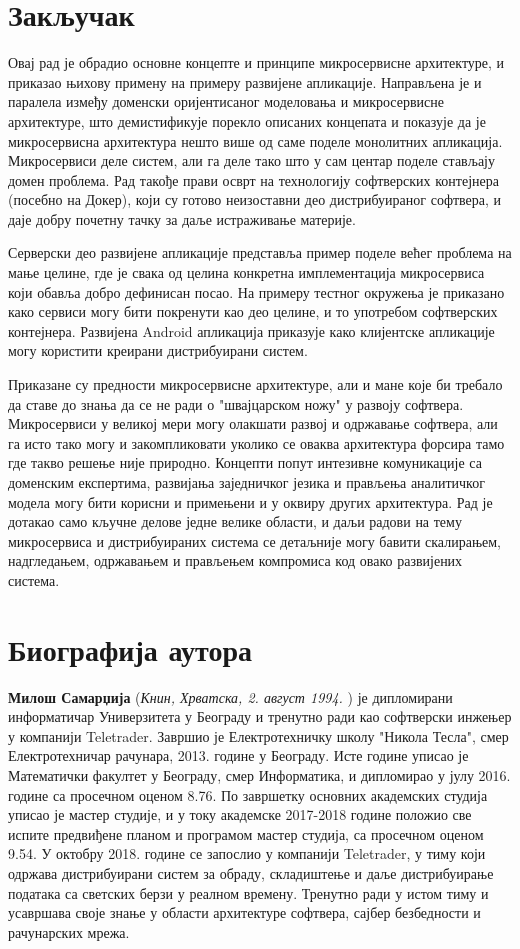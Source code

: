 \documentclass[12pt,oneside]{memoir}
\begin{document}
\chapter{Закључак}
Овај рад је обрадио основне концепте и принципе микросервисне архитектуре, и приказао њихову примену на примеру развијене апликације. Направљена је и паралела између доменски оријентисаног моделовања и микросервисне архитектуре, што демистификује порекло описаних концепата и показује да је микросервисна архитектура нешто више од саме поделе монолитних апликација. Микросервиси деле систем, али га деле тако што у сам центар поделе стављају домен проблема. Рад такође прави осврт на технологију софтверских контејнера (посебно на Докер), који су готово неизоставни део дистрибуираног софтвера, и даје добру почетну тачку за даље истраживање материје.

Серверски део развијене апликације представља пример поделе већег проблема на мање целине, где је свака од целина конкретна имплементација микросервиса који обавља добро дефинисан посао. На примеру тестног окружења је приказано како сервиси могу бити покренути као део целине, и то употребом софтверских контејнера. Развијена Android апликација приказује како клијентске апликације могу користити креирани дистрибуирани систем.

Приказане су предности микросервисне архитектуре, али и мане које би требало да ставе до знања да се не ради о "швајцарском ножу" у развоју софтвера. Микросервиси у великој мери могу олакшати развој и одржавање софтвера, али га исто тако могу и закомпликовати уколико се оваква архитектура форсира тамо где такво решење није природно. Концепти попут интезивне комуникације са доменским експертима, развијања заједничког језика и прављења аналитичког модела могу бити корисни и примењени и у оквиру других архитектура. Рад је дотакао само кључне делове једне велике области, и даљи радови на тему микросервиса и дистрибуираних система се детаљније могу бавити скалирањем, надгледањем, одржавањем и прављењем компромиса код овако развијених система.

\literatura

\backmatter

\chapter{Биографија аутора}
\textbf{Милош Самарџија} (\textit{Книн, Хрватска, 2. август 1994.} ) је дипломирани информатичар Универзитета у Београду и тренутно ради као софтверски инжењер у компанији Teletrader. Завршио је Електротехничку школу "Никола Тесла", смер Електротехничар рачунара, 2013. године у Београду. Исте године уписао је Математички факултет у Београду, смер Информатика, и дипломирао у јулу 2016. године са просечном оценом 8.76. По завршетку основних академских студија уписао је мастер студије, и у току академске 2017-2018 године положио све испите предвиђене планом и програмом мастер студија, са просечном оценом 9.54. У октобру 2018. године се запослио у компанији Teletrader, у тиму који одржава дистрибуирани систем за обраду, складиштење и даље дистрибуирање података са светских берзи у реалном времену. Тренутно ради у истом тиму и усавршава своје знање у области архитектуре софтвера, сајбер безбедности и рачунарских мрежа.
\end{document}
